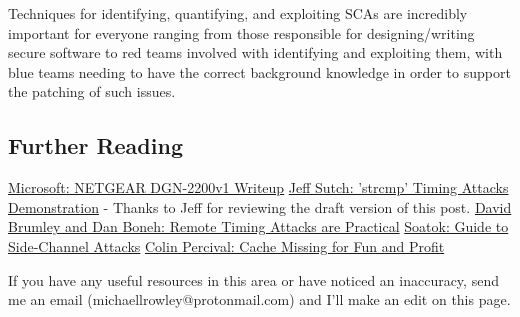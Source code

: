 		
			Techniques for identifying, quantifying, and exploiting SCAs are incredibly important for everyone ranging from those responsible for designing/writing secure
			software to red teams involved with identifying and exploiting them, with blue teams needing to have the correct background knowledge in order to support the
			patching of such issues.
		
\subsection{Further Reading}
		
			\href{https://www.microsoft.com/en-us/security/blog/2021/06/30/microsoft-finds-new-netgear-firmware-vulnerabilities-that-could-lead-to-identity-theft-and-full-system-compromise/}{Microsoft: NETGEAR DGN-2200v1 Writeup}
			\href{https://github.com/jsutch/strcmp_timing_attacks_demo}{Jeff Sutch: 'strcmp' Timing Attacks Demonstration} - Thanks to Jeff for reviewing the draft version of this post.
			\href{https://crypto.stanford.edu/~dabo/papers/ssl-timing.pdf}{David Brumley and Dan Boneh: Remote Timing Attacks are Practical}
			\href{https://soatok.blog/2020/08/27/soatoks-guide-to-side-channel-attacks/}{Soatok: Guide to Side-Channel Attacks}
			\href{https://css.csail.mit.edu/6.858/2013/readings/ht-cache.pdf}{Colin Percival: Cache Missing for Fun and Profit}
		
		
			If you have any useful resources in this area or have noticed an inaccuracy, send me an email (michaellrowley@protonmail.com)
			and I'll make an edit on this page.
